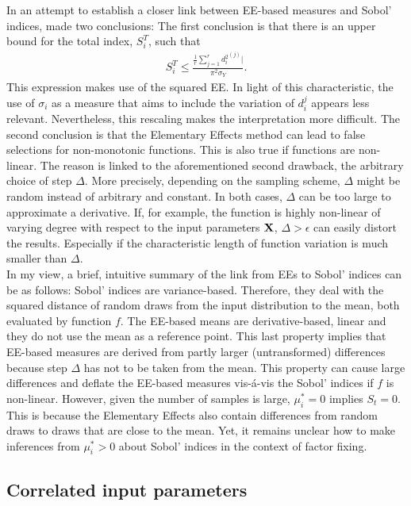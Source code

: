 \documentclass[a4paper,12pt]{article}
\begin{document}
In an attempt to establish a closer link between EE-based measures and Sobol' indices, \cite{kucherenko2009derivative} made two conclusions: The first conclusion is that there is an upper bound for the total index, $S_i^T$, such that
\begin{align}
S_i^T \leq \frac{\frac{1}{r} \sum_{j=1}^{r} {d_i^2}^{(j)}|}{\pi^2 \sigma_Y}.
\end{align}
This expression makes use of the squared EE. In light of this characteristic, the use of $\sigma_i$ as a measure that aims to include the variation of $d_i^{j}$ appears less relevant. Nevertheless, this rescaling makes the interpretation more difficult. The second conclusion is that the Elementary Effects method can lead to false selections for non-monotonic functions. This is also true if functions are non-linear. The reason is linked to the aforementioned second drawback, the arbitrary choice of step $\Delta$. More precisely, depending on the sampling scheme, $\Delta$ might be random instead of arbitrary and constant. In both cases, $\Delta$ can be too large to approximate a derivative. If, for example, the function is highly non-linear of varying degree with respect to the input parameters $\bold{X}$, $\Delta > \epsilon$ can easily distort the results. Especially if the characteristic length of function variation is much smaller than $\Delta$.\\


\noindent
In my view, a brief, intuitive summary of the link from EEs to Sobol' indices can be as follows: Sobol' indices are variance-based. Therefore, they deal with the squared distance of random draws from the input distribution to the mean, both evaluated by function $f$. The EE-based means are derivative-based, linear and they do not use the mean as a reference point. This last property implies that EE-based measures are derived from partly larger (untransformed) differences because step $\Delta$ has not to be taken from the mean. This property can cause large differences and deflate the EE-based measures vis-á-vis the Sobol' indices if $f$ is non-linear. However, given the number of samples is large, $\mu_i^*=0$ implies $S_t=0$. This is because the Elementary Effects also contain differences from random draws to draws that are close to the mean. Yet, it remains unclear how to make inferences from $\mu_i^*>0$ about Sobol' indices in the context of factor fixing.

\subsection{Correlated input parameters}
\end{document}
